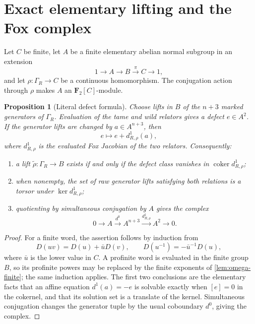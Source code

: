 \documentclass[11pt,reqno]{amsart}
\newtheorem{proposition}[theorem]{Proposition}
\theoremstyle{remark}
\numberwithin{equation}{section}
\newcommand{\F}{\mathbf F}
\newcommand{\coker}{\operatorname{coker}}
\begin{document}
\section{Exact elementary lifting and the Fox complex}

Let \(C\) be finite, let \(A\) be a finite elementary abelian normal
subgroup in an extension
\[
 1\longrightarrow A\longrightarrow B\stackrel{\pi}{\longrightarrow}C
 \longrightarrow1,
\]
and let \(\rho:\Gamma_R\to C\) be a continuous homomorphism.  The
conjugation action through \(\rho\) makes \(A\) an \(\F_2[C]\)-module.

\begin{proposition}[Literal defect formula]\label{prop:defect}
Choose lifts in \(B\) of the \(n+3\) marked generators of \(\Gamma_R\).
Evaluation of the tame and wild relators gives a defect
\(e\in A^2\).  If the generator lifts are changed by
\(a\in A^{n+3}\), then
\[
 e\longmapsto e+d^1_{R,\rho}(a),
\]
where \(d^1_{R,\rho}\) is the evaluated Fox Jacobian of the two relators.
Consequently:
\begin{enumerate}
\item a lift \(\widetilde\rho:\Gamma_R\to B\) exists if and only if the
defect class vanishes in \(\coker d^1_{R,\rho}\);
\item when nonempty, the set of raw generator lifts satisfying both
relations is a torsor under \(\ker d^1_{R,\rho}\);
\item quotienting by simultaneous conjugation by \(A\) gives the complex
\[
 0\longrightarrow A\stackrel{d^0}{\longrightarrow}A^{n+3}
 \stackrel{d^1_{R,\rho}}{\longrightarrow}A^2\longrightarrow0.
\]
\end{enumerate}
\end{proposition}

\begin{proof}
For a finite word, the assertion follows by induction from
\[
 D(uv)=D(u)+\bar uD(v),\qquad
 D(u^{-1})=-\bar u^{-1}D(u),
\]
where \(\bar u\) is the lower value in \(C\).  A profinite word is
evaluated in the finite group \(B\), so its profinite powers may be
replaced by the finite exponents of \cref{lem:omega-finite}; the same
induction applies.  The first two conclusions are the elementary facts
that an affine equation \(d^1(a)=-e\) is solvable exactly when
\([e]=0\) in the cokernel, and that its solution set is a translate of
the kernel.  Simultaneous conjugation changes the generator tuple by the
usual coboundary \(d^0\), giving the complex.
\end{proof}
\end{document}
